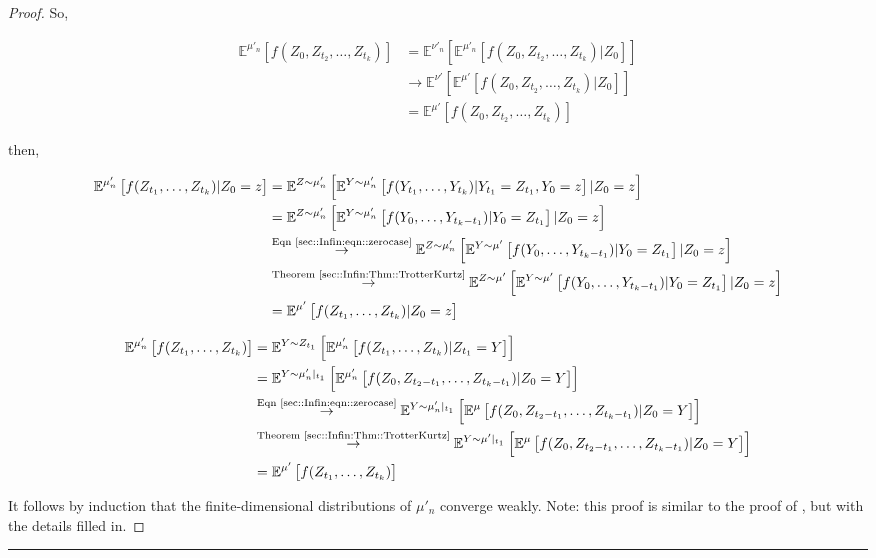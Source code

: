 \documentclass[12pt]{article}
\newcommand{\mb}{\mathbb}
\newcommand{\ra}{\rightarrow}
\newcommand{\os}{\overset}
\newcommand{\te}{\text}
\newcommand{\lin}{\rule{\linewidth}{0.4 pt}}
\newcommand{\exmu}[2]{\mb{E}^{#1}\left[#2\right]}	%
\begin{document}
\begin{proof}
So,

\begin{align*}
\exmu{\mu'_n}{f(Z_0,Z_{t_2},\dots,Z_{t_k})} &= \exmu{\nu'_n}{\exmu{\mu'_n}{f(Z_0,Z_{t_2},\dots,Z_{t_k})|Z_0}}\\
&\ra \exmu{\nu'}{\exmu{\mu'}{f(Z_0,Z_{t_2},\dots,Z_{t_k})|Z_0}}\\
&= \exmu{\mu'}{f(Z_0,Z_{t_2},\dots,Z_{t_k})}
\end{align*}

then,

\begin{align*}
\exmu{\mu'_n}{f(Z_{t_1},\dots,Z_{t_k})|Z_0=z}&=\exmu{Z\sim\mu'_n}{\exmu{Y\sim \mu'_n}{f(Y_{t_1},\dots,Y_{t_k})|Y_{t_1}=Z_{t_1},Y_0=z}|Z_0=z}\\
&=\exmu{Z\sim\mu'_n}{\exmu{Y\sim \mu'_n}{f(Y_{0},\dots,Y_{t_k-t_1})|Y_{0}=Z_{t_1}}|Z_0=z}\\
&\os{\te{Eqn \eqref{sec::Infin:eqn::zerocase}}}{\ra} \exmu{Z\sim\mu'_n}{\exmu{Y\sim \mu'}{f(Y_{0},\dots,Y_{t_k-t_1})|Y_{0}=Z_{t_1}}|Z_0=z}\\
&\os{\te{Theorem \ref{sec::Infin:Thm::TrotterKurtz}}}{\ra} \exmu{Z\sim\mu'}{\exmu{Y\sim \mu'}{f(Y_{0},\dots,Y_{t_k-t_1})|Y_{0}=Z_{t_1}}|Z_0=z}\\
&=\exmu{\mu'}{f(Z_{t_1},\dots,Z_{t_k})|Z_0=z}
\end{align*}

\begin{align*}
\exmu{\mu'_n}{f(Z_{t_1},\dots,Z_{t_k})}&= \exmu{Y\sim Z_{t_1}}{\exmu{\mu'_n}{f(Z_{t_1},\dots,Z_{t_k})|Z_{t_1}=Y}}\\
&=\exmu{Y\sim \mu'_n|_{t_1}}{\exmu{\mu'_n}{f(Z_{0},Z_{t_2-t_1},\dots,Z_{t_k-t_1})|Z_0=Y}}\\
&\os{\te{Eqn \eqref{sec::Infin:eqn::zerocase}}}{\ra} \exmu{Y\sim \mu'_n|_{t_1}}{\exmu{\mu}{f(Z_{0},Z_{t_2-t_1},\dots,Z_{t_k-t_1})|Z_0=Y}}\\
&\os{\te{Theorem \ref{sec::Infin:Thm::TrotterKurtz}}}{\ra} \exmu{Y\sim \mu'|_{t_1}}{\exmu{\mu}{f(Z_{0},Z_{t_2-t_1},\dots,Z_{t_k-t_1})|Z_0=Y}}\\
&=\exmu{\mu'}{f(Z_{t_1},\dots,Z_{t_k})}
\end{align*}

It follows by induction that the finite-dimensional distributions of \(\mu'_n\) converge weakly. Note: this proof is similar to the proof of \cite[Theorem 4.2]{Kur81}, but with the details filled in.
\end{proof}

\lin 
\end{document}
